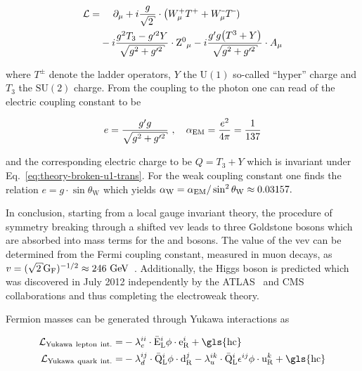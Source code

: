 \begin{align}
\mathcal{L}=&~~~~\partial_\mu+i\frac{g}{\sqrt{2}}\cdot\big(W^{\rmplus}_\mu T^{\rmplus}+W^{\rmminus}_\mu T^{\rmminus})\\
&-i\frac{g^2T_3-g^{\prime 2}Y}{\sqrt{g^2+g^{\prime 2}}}\cdot\zboson_\mu-i\frac{g^{\prime}g\big(T^3+Y\big)}{\sqrt{g^2+g^{\prime 2}}}\cdot A_\mu
\end{align}

where $T^{\pm}$ denote the ladder operators, $Y$ the $\mathrm{U(1)}$ so-called ``hyper'' charge and $T_3$ the $\mathrm{SU(2)}$  charge. From the coupling to the photon one can read of the electric coupling constant to be 

\begin{equation}
e=\frac{g^{\prime} g}{\sqrt{g^2+g^{\prime 2}}}~,\quad \aem=\frac{e^2}{4\pi}=\frac{1}{137}
\end{equation}

and the corresponding electric charge to be $Q=T_3+Y$ which is invariant under Eq.~\ref{eq:theory-broken-u1-trans}. For the weak coupling constant one finds the relation $e=g\cdot\sin\theta_\mathrm{W}$ which yields ${\alpha_\mathrm{W}}={\alpha_\mathrm{EM}}/\sin^2\theta_\mathrm{W}\approx0.03157.$

In conclusion, starting from a local gauge invariant theory, the procedure of symmetry breaking through a shifted \gls{vev} leads to three Goldstone bosons which are absorbed into mass terms for the \wboson and \zboson bosons. The value of the \gls{vev} can be determined from the Fermi coupling constant, measured in muon decays, as $v = (\sqrt{2}\mathrm{G_{F}})^{-1/2}\approx 246~\GeV$~\cite{PhysRevLett.106.041803}. Additionally, the Higgs boson is predicted which was discovered in July 2012 independently by the ATLAS~\cite{Aad:2012tfa} and CMS~\cite{Chatrchyan:2012xdj} collaborations and thus completing the electroweak theory.


Fermion masses can be generated through Yukawa interactions as

\begin{align}
\mathcal{L}_\mathrm{Yukawa~lepton~int.}=&-\lambda_{e}^{ii}\cdot\bar{\mathrm{E}}^{i}_\mathrm{L}\phi\cdot\mathrm{e}^{i}_\mathrm{R}+\mathrm{\gls{hc}} \label{eq:theory-lepton-yukawa}\\
\mathcal{L}_\mathrm{Yukawa~quark~int.}=&-\lambda_{d}^{ij}\cdot\bar{\mathrm{Q}}^{i}_\mathrm{L}\phi\cdot\mathrm{d}^{j}_\mathrm{R}-\lambda_{u}^{ik}\cdot\bar{\mathrm{Q}}^{i}_\mathrm{L}\epsilon^{ij}\phi\cdot\mathrm{u}^{k}_\mathrm{R} +\mathrm{\gls{hc}} \label{eq:theory-quark-yukawa}
\end{align}

